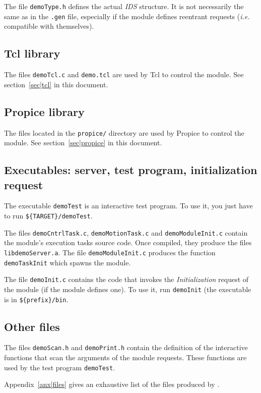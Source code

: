 The file \texttt{demoType.h} defines the actual \emph{IDS} structure. It is
not necessarily the same as  in the  \texttt{.gen}  file, especially if  the
module   defines   reentrant   requests   (\emph{i.e.}   compatible  with
themselves).

\subsection{Tcl library}

The files  \texttt{demoTcl.c} and \texttt{demo.tcl}  are used by Tcl to control
the module. See section~\ref{sec|tcl} in this document.


\subsection{Propice library}

The files located in the \texttt{propice/} directory are  used by Propice to
control the module. See section~\ref{sec|propice} in this document.


\subsection{Executables: server, test program, initialization request}

The executable \texttt{demoTest} is an interactive test program. To use it,
you just have to  run
\texttt{\$\{TARGET\}/demoTest}.

The  files    \texttt{demoCntrlTask.c},   \texttt{demoMotionTask.c}    and 
\texttt{demoModuleInit.c} contain the module's execution tasks source code.  Once
compiled, they produce the  files  
\texttt{libdemoServer.a}.  The   file  \texttt{demoModuleInit.c} produces    the
function \texttt{demoTaskInit} which spawns the module.

The file \texttt{demoInit.c} contains the code that invokes the {\em
Initialization} request of the module (if the module defines one). To use
it, run \texttt{demoInit} (the executable is in 
\texttt{\$\{prefix\}/bin}.


\subsection{Other files}

The  files \texttt{demoScan.h} and \texttt{demoPrint.h} contain the definition
of  the interactive   functions  that scan  the  arguments  of the module
requests. These functions are used by the test program \texttt{demoTest}.

Appendix~\ref{anx|files} gives an exhaustive list  of the files  produced
by \GenoM.

